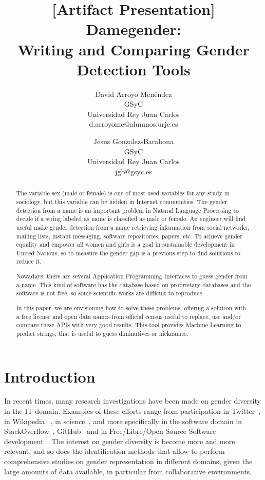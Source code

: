 \documentclass[a4paper]{article}
\title{[Artifact Presentation] Damegender: \\ Writing and Comparing Gender Detection Tools}
\author{
David Arroyo Men\'endez \\ GSyC \\ Universidad Rey Juan Carlos \\ d.arroyome@alumnos.urjc.es
\and
Jesus Gonzalez-Barahona \\ GSyC \\ Universidad Rey Juan Carlos \\ jgb@gsyc.es
}
\begin{document}
\maketitle

\begin{abstract}

The variable sex (male or female) is one of most used variables for
any study in sociology, but this variable can be hidden in Internet
communities. The gender detection from a name is an important problem
in Natural Language Processing to decide if a string labeled as name
is classified as male or female. An engineer will find useful
make gender detection from a name retrieving information from social
networks, mailing lists, instant messaging, software repositories,
papers, etc. To achieve gender equality and empower all women and
girls is a goal in sustainable development in United Nations, so to
measure the gender gap is a previous step to find solutions to reduce
it.

Nowadays, there are several Application Programming Interfaces to
guess gender from a name. This kind of software has the database
based on proprietary databases and the software is not free, so some
scientific works are difficult to reproduce.

In this paper, we are envisioning how to solve these problems,
offering a solution with a free license and open data names from
official census useful to replace, use and/or compare these APIs with
very good results. This tool provides Machine Learning to predict
strings, that is useful to guess diminutives or nicknames.
\end{abstract}


\section{Introduction}

In recent times, many research investigations have been made on gender
diversity in the IT domain.
Examples of these efforts range from participation in Twitter~\cite{burger2011discriminating,mislove2011understanding},
in Wikipedia ~\cite{antin2011gender,hill2013wikipedia}, in science~\cite{holman2018gender,dollar1999gender}, and more specifically in the software domain in StackOverflow~\cite{vasilescu2012gender}, GitHub~\cite{vasilescu2015gender} and in Free/Libre/Open Source Software development~\cite{robles2014floss}.
The interest on gender diversity is become more and more relevant, and so does the identification methods that allow to perform comprehensive studies on gender representation in different domains, given the large amounts of data available, in particular from collaborative environments.
\end{document}
